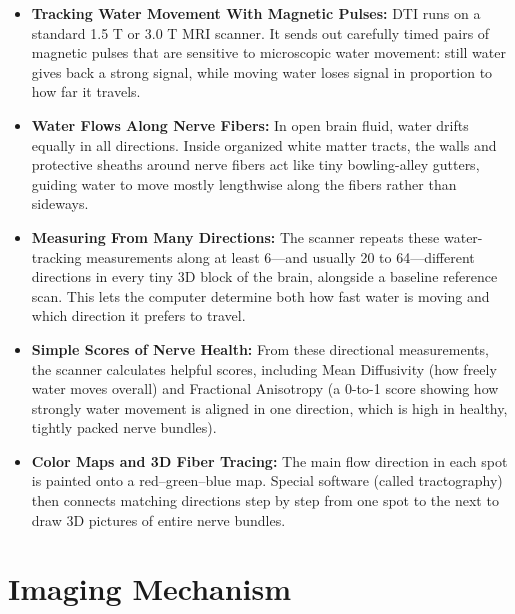 \begin{itemize}
    \item \textbf{Tracking Water Movement With Magnetic Pulses:} DTI runs on a standard 1.5 T or 3.0 T MRI scanner. It sends out carefully timed pairs of magnetic pulses that are sensitive to microscopic water movement: still water gives back a strong signal, while moving water loses signal in proportion to how far it travels.
    \item \textbf{Water Flows Along Nerve Fibers:} In open brain fluid, water drifts equally in all directions. Inside organized white matter tracts, the walls and protective sheaths around nerve fibers act like tiny bowling-alley gutters, guiding water to move mostly lengthwise along the fibers rather than sideways.
    \item \textbf{Measuring From Many Directions:} The scanner repeats these water-tracking measurements along at least 6---and usually 20 to 64---different directions in every tiny 3D block of the brain, alongside a baseline reference scan. This lets the computer determine both how fast water is moving and which direction it prefers to travel.
    \item \textbf{Simple Scores of Nerve Health:} From these directional measurements, the scanner calculates helpful scores, including Mean Diffusivity (how freely water moves overall) and Fractional Anisotropy (a 0-to-1 score showing how strongly water movement is aligned in one direction, which is high in healthy, tightly packed nerve bundles).
    \item \textbf{Color Maps and 3D Fiber Tracing:} The main flow direction in each spot is painted onto a red--green--blue map. Special software (called tractography) then connects matching directions step by step from one spot to the next to draw 3D pictures of entire nerve bundles.
\end{itemize}

\section{Imaging Mechanism}

